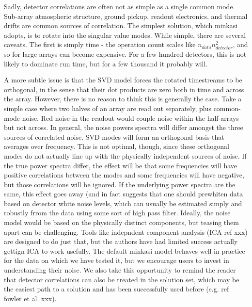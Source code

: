 \documentclass[12]{article}
\begin{document}
Sadly, detector correlations are often not as simple as a single
common mode.  Sub-array atmospheric structure, ground pickup, readout
electronics, and thermal drifts are common sources of correlation.
The simplest solution, which minkasi adopts, is to rotate into the
singular value modes.  While simple, there are several caveats. The
first is simply time - the operation count scales like
$n_{data}n_{detector}^2$, and so for large arrays can become
expensive.  For a few hundred detectors, this is not likely to
dominate run time, but for a few thousand it probably will.  

A more subtle issue is that the SVD model forces the rotated
timestreams to be orthogonal, in the sense that their dot products are
zero both in time and across the array.  However, there is no reason
to think this is generally the case.  Take a simple case where two
halves of an array are read out separately, plus common-mode noise.
Red noise in the readout would couple noise within the half-arrays but
not across.  In general, the noise powers spectra will differ amongst
the three sources of correlated noise.  SVD modes will form an
orthogonal basis that averages over frequency.  This is not optimal,
though, since these orthogonal modes do not actually line up with the
physically independent sources of noise.  If the true power spectra
differ, the effect will be that some frequencies will have positive
correlations between the modes and some frequencies will have
negative, but those correlations will be ignored.  If the underlying
power spectra are the same, this effect goes away (and in fact
suggests that one should prewhiten data based on detector white noise
levels, which can usually be estimated simply and robustly frrom the
data using some sort of high pass filter.  Ideally, the noise model
would be based on the physically distinct components, but teasing them
apart can be challenging.  Tools like indepndent component analysis
(ICA ref xxx) are designed to do just that, but the authors have had
limited success actually gettign ICA to work usefully.  The default
minkasi model behaves well in practice for the data on which we have
tested it, but we encourage users to invest in understanding their
noise.  We also take this opportunity to remind the reader that
detector correlations can also be treated in the solution set, which
may be the easiest path to a solution and has been successfully used
before (e.g. ref fowler et al. xxx).  
\end{document}
